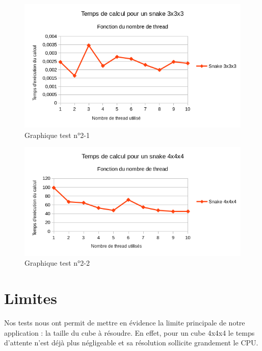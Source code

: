 \begin{figure}[h]
 \centering
 \includegraphics[scale=0.7,keepaspectratio=true]{img/test2-1.png}
 \caption{Graphique test n°2-1}
\end{figure}

\begin{figure}[h]
 \centering
 \includegraphics[scale=0.7,keepaspectratio=true]{img/test2-2.png}
 \caption{Graphique test n°2-2}
\end{figure}

\section{Limites}
Nos tests nous ont permit de mettre en évidence la limite principale de notre application : la taille du cube à résoudre. En effet, pour un cube 4x4x4 le temps d'attente n'est déjà plus négligeable et sa résolution sollicite grandement le CPU. 